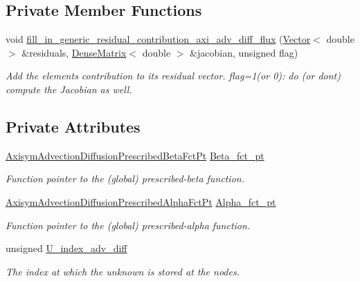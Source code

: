 \subsection*{Private Member Functions}
\begin{DoxyCompactItemize}
\item 
void \hyperlink{classoomph_1_1AxisymAdvectionDiffusionFluxElement_a2c11d285cf27d758e1863b15c95f7b31}{fill\+\_\+in\+\_\+generic\+\_\+residual\+\_\+contribution\+\_\+axi\+\_\+adv\+\_\+diff\+\_\+flux} (\hyperlink{classoomph_1_1Vector}{Vector}$<$ double $>$ \&residuals, \hyperlink{classoomph_1_1DenseMatrix}{Dense\+Matrix}$<$ double $>$ \&jacobian, unsigned flag)
\begin{DoxyCompactList}\small\item\em Add the element\textquotesingle{}s contribution to its residual vector. flag=1(or 0)\+: do (or don\textquotesingle{}t) compute the Jacobian as well. \end{DoxyCompactList}\end{DoxyCompactItemize}
\subsection*{Private Attributes}
\begin{DoxyCompactItemize}
\item 
\hyperlink{classoomph_1_1AxisymAdvectionDiffusionFluxElement_ad4453706dae676758946691686e1a1c3}{Axisym\+Advection\+Diffusion\+Prescribed\+Beta\+Fct\+Pt} \hyperlink{classoomph_1_1AxisymAdvectionDiffusionFluxElement_a410eebdc595edf787822c63e98766beb}{Beta\+\_\+fct\+\_\+pt}
\begin{DoxyCompactList}\small\item\em Function pointer to the (global) prescribed-\/beta function. \end{DoxyCompactList}\item 
\hyperlink{classoomph_1_1AxisymAdvectionDiffusionFluxElement_aa0922f19043ccc259c61c704fa3b5767}{Axisym\+Advection\+Diffusion\+Prescribed\+Alpha\+Fct\+Pt} \hyperlink{classoomph_1_1AxisymAdvectionDiffusionFluxElement_a5e700f50fff5fcdcf9701afe3719ab12}{Alpha\+\_\+fct\+\_\+pt}
\begin{DoxyCompactList}\small\item\em Function pointer to the (global) prescribed-\/alpha function. \end{DoxyCompactList}\item 
unsigned \hyperlink{classoomph_1_1AxisymAdvectionDiffusionFluxElement_a9a1a5af501dd6839ffdfe132a2f9c515}{U\+\_\+index\+\_\+adv\+\_\+diff}
\begin{DoxyCompactList}\small\item\em The index at which the unknown is stored at the nodes. \end{DoxyCompactList}\end{DoxyCompactItemize}
